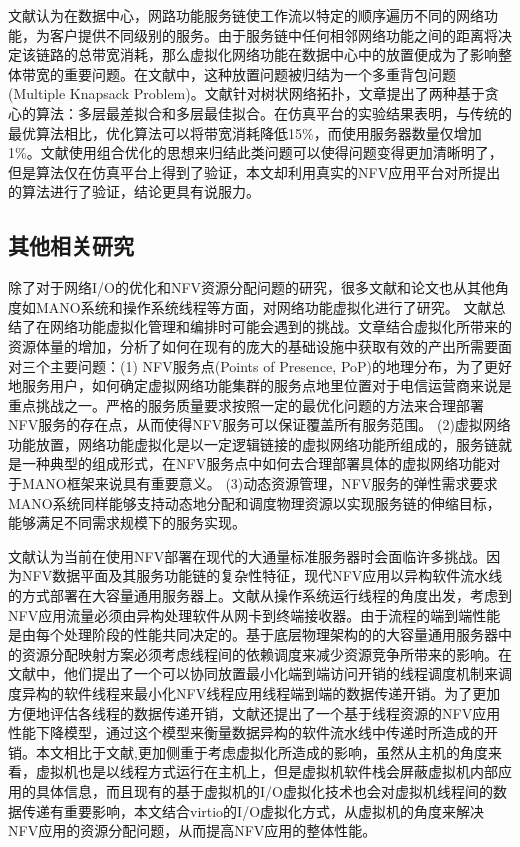 文献认为在数据中心，网路功能服务链使工作流以特定的顺序遍历不同的网络功能，为客户提供不同级别的服务。由于服务链中任何相邻网络功能之间的距离将决定该链路的总带宽消耗，那么虚拟化网络功能在数据中心中的放置便成为了影响整体带宽的重要问题。在文献中，这种放置问题被归结为一个多重背包问题(Multiple Knapsack Problem)。文献针对树状网络拓扑，文章提出了两种基于贪心的算法：多层最差拟合和多层最佳拟合。在仿真平台的实验结果表明，与传统的最优算法相比，优化算法可以将带宽消耗降低15\%，而使用服务器数量仅增加1\%。文献使用组合优化的思想来归结此类问题可以使得问题变得更加清晰明了，但是算法仅在仿真平台上得到了验证，本文却利用真实的NFV应用平台对所提出的算法进行了验证，结论更具有说服力。


\subsection{其他相关研究}
除了对于网络I/O的优化和NFV资源分配问题的研究，很多文献和论文也从其他角度如MANO系统和操作系统线程等方面，对网络功能虚拟化进行了研究。
文献总结了在网络功能虚拟化管理和编排时可能会遇到的挑战。文章结合虚拟化所带来的资源体量的增加，分析了如何在现有的庞大的基础设施中获取有效的产出所需要面对三个主要问题：(1) NFV服务点(Points of Presence, PoP)的地理分布，为了更好地服务用户，如何确定虚拟网络功能集群的服务点地里位置对于电信运营商来说是重点挑战之一。严格的服务质量要求按照一定的最优化问题的方法来合理部署NFV服务的存在点，从而使得NFV服务可以保证覆盖所有服务范围。  (2)虚拟网络功能放置，网络功能虚拟化是以一定逻辑链接的虚拟网络功能所组成的，服务链就是一种典型的组成形式，在NFV服务点中如何去合理部署具体的虚拟网络功能对于MANO框架来说具有重要意义。 (3)动态资源管理，NFV服务的弹性需求要求MANO系统同样能够支持动态地分配和调度物理资源以实现服务链的伸缩目标，能够满足不同需求规模下的服务实现。

文献认为当前在使用NFV部署在现代的大通量标准服务器时会面临许多挑战。因为NFV数据平面及其服务功能链的复杂性特征，现代NFV应用以异构软件流水线的方式部署在大容量通用服务器上。文献从操作系统运行线程的角度出发，考虑到NFV应用流量必须由异构处理软件从网卡到终端接收器。由于流程的端到端性能是由每个处理阶段的性能共同决定的。基于底层物理架构的的大容量通用服务器中的资源分配映射方案必须考虑线程间的依赖调度来减少资源竞争所带来的影响。在文献中，他们提出了一个可以协同放置最小化端到端访问开销的线程调度机制来调度异构的软件线程来最小化NFV线程应用线程端到端的数据传递开销。为了更加方便地评估各线程的数据传递开销，文献还提出了一个基于线程资源的NFV应用性能下降模型，通过这个模型来衡量数据异构的软件流水线中传递时所造成的开销。本文相比于文献,更加侧重于考虑虚拟化所造成的影响，虽然从主机的角度来看，虚拟机也是以线程方式运行在主机上，但是虚拟机软件栈会屏蔽虚拟机内部应用的具体信息，而且现有的基于虚拟机的I/O虚拟化技术也会对虚拟机线程间的数据传递有重要影响，本文结合virtio的I/O虚拟化方式，从虚拟机的角度来解决NFV应用的资源分配问题，从而提高NFV应用的整体性能。

